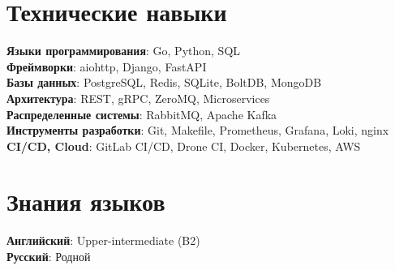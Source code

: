 \documentclass[letterpaper,11pt]{article}
\begin{document}
\section{Технические навыки}
 \begin{itemize}[leftmargin=0.15in, label={}]
    \small{\item{
     \textbf{Языки программирования}{: Go, Python, SQL} \\
     \textbf{Фреймворки}{: aiohttp, Django, FastAPI} \\
     \textbf{Базы данных}{: PostgreSQL, Redis, SQLite, BoltDB, MongoDB}\\
     \textbf{Архитектура}{: REST, gRPC, ZeroMQ, Microservices}\\
     \textbf{Распределенные системы}{: RabbitMQ, Apache Kafka}\\
     \textbf{Инструменты разработки}{: Git, Makefile, Prometheus, Grafana, Loki, nginx} \\
     \textbf{CI/CD, Cloud}{: GitLab CI/CD, Drone CI, Docker, Kubernetes, AWS}\\
    }}
 \end{itemize}


\section{Знания языков}
 \begin{itemize}[leftmargin=0.15in, label={}]
    \small{\item{
     \textbf{Английский}{: Upper-intermediate (B2)} \\
     \textbf{Русский}{: Родной}
    }}
 \end{itemize}


\end{document}
